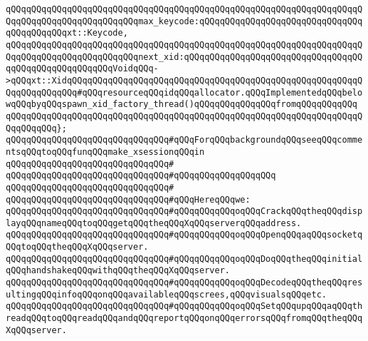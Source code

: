 \verb|qQQqqQQqqQQqqQQqqQQqqQQqqQQqqQQqqQQqqQQqqQQqqQQqqQQqqQQqqQQqqQQqqQQqqQQqqQQqqQQqqQQqqQQqqQQqqQQqmax_keycode:qQQqqQQqqQQqqQQqqQQqqQQqqQQqqQQqqQQqqQQqqQQqxt::Keycode,|\newline
\newline
\verb|qQQqqQQqqQQqqQQqqQQqqQQqqQQqqQQqqQQqqQQqqQQqqQQqqQQqqQQqqQQqqQQqqQQqqQQqqQQqqQQqqQQqqQQqqQQqqQQqnext_xid:qQQqqQQqqQQqqQQqqQQqqQQqqQQqqQQqqQQqqQQqqQQqqQQqqQQqqQQqVoidqQQq->qQQqxt::XidqQQqqQQqqQQqqQQqqQQqqQQqqQQqqQQqqQQqqQQqqQQqqQQqqQQqqQQqqQQqqQQqqQQqqQQq#qQQqresourceqQQqidqQQqallocator.qQQqImplementedqQQqbelowqQQqbyqQQqspawn_xid_factory_thread()qQQqqQQqqQQqqQQqfromqQQqqQQqqQQq|\newline
\verb|qQQqqQQqqQQqqQQqqQQqqQQqqQQqqQQqqQQqqQQqqQQqqQQqqQQqqQQqqQQqqQQqqQQqqQQqqQQqqQQq};|\newline
\newline
\newline
\verb|qQQqqQQqqQQqqQQqqQQqqQQqqQQqqQQq#qQQqForqQQqbackgroundqQQqseeqQQqcommentsqQQqtoqQQqfunqQQqmake_xsessionqQQqin|\newline
\verb|qQQqqQQqqQQqqQQqqQQqqQQqqQQqqQQq#|\newline
\verb|qQQqqQQqqQQqqQQqqQQqqQQqqQQqqQQq#qQQqqQQqqQQqqQQqqQQq|\newline
\verb|qQQqqQQqqQQqqQQqqQQqqQQqqQQqqQQq#|\newline
\verb|qQQqqQQqqQQqqQQqqQQqqQQqqQQqqQQq#qQQqHereqQQqwe:|\newline
\verb|qQQqqQQqqQQqqQQqqQQqqQQqqQQqqQQq#qQQqqQQqqQQqoqQQqCrackqQQqtheqQQqdisplayqQQqnameqQQqtoqQQqgetqQQqtheqQQqXqQQqserverqQQqaddress.|\newline
\verb|qQQqqQQqqQQqqQQqqQQqqQQqqQQqqQQq#qQQqqQQqqQQqoqQQqOpenqQQqaqQQqsocketqQQqtoqQQqtheqQQqXqQQqserver.|\newline
\verb|qQQqqQQqqQQqqQQqqQQqqQQqqQQqqQQq#qQQqqQQqqQQqoqQQqDoqQQqtheqQQqinitialqQQqhandshakeqQQqwithqQQqtheqQQqXqQQqserver.|\newline
\verb|qQQqqQQqqQQqqQQqqQQqqQQqqQQqqQQq#qQQqqQQqqQQqoqQQqDecodeqQQqtheqQQqresultingqQQqinfoqQQqonqQQqavailableqQQqscrees,qQQqvisualsqQQqetc.|\newline
\verb|qQQqqQQqqQQqqQQqqQQqqQQqqQQqqQQq#qQQqqQQqqQQqoqQQqSetqQQqupqQQqaqQQqthreadqQQqtoqQQqreadqQQqandqQQqreportqQQqonqQQqerrorsqQQqfromqQQqtheqQQqXqQQqserver.|\newline
